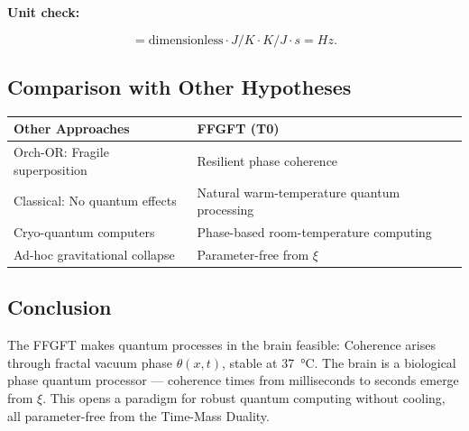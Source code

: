 	\textbf{Unit check:}
	
	\begin{equation}
		[f_{\text{sync}}] = \text{dimensionless} \cdot \si{J/K} \cdot \si{K} / \si{J \cdot s} = \si{Hz}.
	\end{equation}
	
	\subsection*{Comparison with Other Hypotheses}
	
	\begin{center}
		\begin{tabular}{p{}p{}}
			\textbf{Other Approaches} & \textbf{FFGFT (T0)} \\
			\hline
			Orch-OR: Fragile superposition & Resilient phase coherence \\
			Classical: No quantum effects & Natural warm-temperature quantum processing \\
			Cryo-quantum computers & Phase-based room-temperature computing \\
			Ad-hoc gravitational collapse & Parameter-free from \(\xi\) \\
		\end{tabular}
	\end{center}
	
	\subsection*{Conclusion}
	
	The FFGFT makes quantum processes in the brain feasible: Coherence arises through fractal vacuum phase \(\theta(x,t)\), stable at \SI{37}{\celsius}. The brain is a biological phase quantum processor — coherence times from milliseconds to seconds emerge from \(\xi\). This opens a paradigm for robust quantum computing without cooling, all parameter-free from the Time-Mass Duality.



